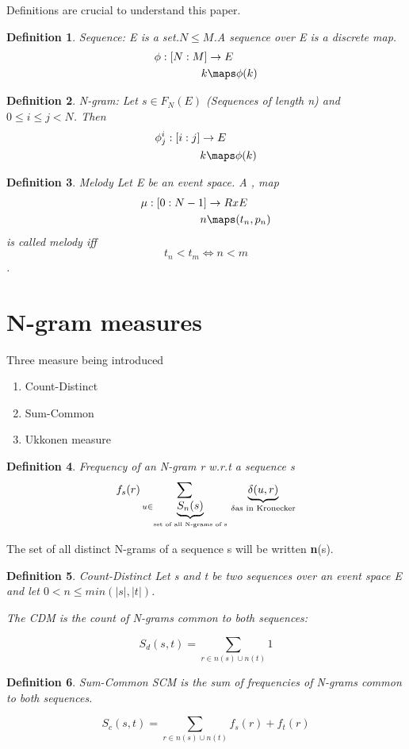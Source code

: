 \documentclass{article}
\newtheorem{definition}{Definition}[section]
\begin{document}
	Definitions are crucial to understand this paper.

	\begin{definition}{Sequence}:
		E is a set.$N \leq M$.A sequence over E is a discrete map.
		\begin{align*}
			\phi : [N:M] &\rightarrow E\\
			k &\maps \phi(k)
		\end{align*}
	\end{definition}

	\begin{definition}{N-gram}:
		Let $s \in F_N(E)$ (Sequences of length n) and $0 \leq i \leq j < N$. Then 
		\begin{align*}
			\phi_j^i : [i:j] &\rightarrow E\\
			&k\maps \phi(k)
		\end{align*}
	\end{definition}

	\begin{definition}{Melody}
		Let E be an event space. A  ,  map
		\begin{align*}
			\mu : [0:N-1] &\rightarrow R x E\\
				n&\maps (t_n , p_n)
		\end{align*}
		is called melody iff \[ t_n < t_m \iff n < m\].
	\end{definition}

	\section*{N-gram measures}
		Three measure being introduced
		\begin{enumerate}
			\item Count-Distinct
			\item Sum-Common
			\item Ukkonen measure
		\end{enumerate}

		\begin{definition}{Frequency of an N-gram r w.r.t a sequence s}
			\[
				f_s(r) \sum_{u\in \underbrace{S_n(s)}_{\text{set of all N-grams of s}}} \\ \underbrace{\delta(u,r)}_{\delta \text{as in Kronecker}}
			\]
		\end{definition}
		The set of all distinct N-grams of a sequence s will be written \textbf{n}(s).


		\begin{definition}{Count-Distinct}
			Let s and t be two sequences over an event space E and let $0 < n \leq min(|s|,|t|)$.

			The CDM is the count of N-grams common to both sequences:

			\[
				S_d(s,t) = \sum_{r\in n(s) \cup n(t)} 1
			\]
		\end{definition}

		\begin{definition}{Sum-Common}
			SCM is the sum of frequencies of N-grams common to both sequences.

			\[
				S_c(s,t) = \sum_{r\in n(s) \cup n(t)} f_s(r) + f_t(r)
			\]

		\end{definition}
			
\end{document}
